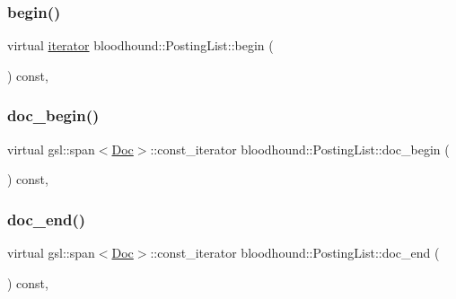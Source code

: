 \subsubsection{\texorpdfstring{begin()}{begin()}}
{\footnotesize\ttfamily virtual \hyperlink{structbloodhound_1_1PostingList_1_1iterator}{iterator} bloodhound\+::\+Posting\+List\+::begin (\begin{DoxyParamCaption}{ }\end{DoxyParamCaption}) const\hspace{0.3cm}{\ttfamily [inline]}, {\ttfamily [virtual]}}

\mbox{\label{classbloodhound_1_1PostingList_aac3dbe7fbf43ce93031e97b16bcfc888}} 
\subsubsection{\texorpdfstring{doc\+\_\+begin()}{doc\_begin()}}
{\footnotesize\ttfamily virtual gsl\+::span$<$\hyperlink{structbloodhound_1_1Doc}{Doc}$>$\+::const\+\_\+iterator bloodhound\+::\+Posting\+List\+::doc\+\_\+begin (\begin{DoxyParamCaption}{ }\end{DoxyParamCaption}) const\hspace{0.3cm}{\ttfamily [inline]}, {\ttfamily [virtual]}}

\mbox{\label{classbloodhound_1_1PostingList_aac468540b0a376d9b378a4333546245c}} 
\subsubsection{\texorpdfstring{doc\+\_\+end()}{doc\_end()}}
{\footnotesize\ttfamily virtual gsl\+::span$<$\hyperlink{structbloodhound_1_1Doc}{Doc}$>$\+::const\+\_\+iterator bloodhound\+::\+Posting\+List\+::doc\+\_\+end (\begin{DoxyParamCaption}{ }\end{DoxyParamCaption}) const\hspace{0.3cm}{\ttfamily [inline]}, {\ttfamily [virtual]}}

